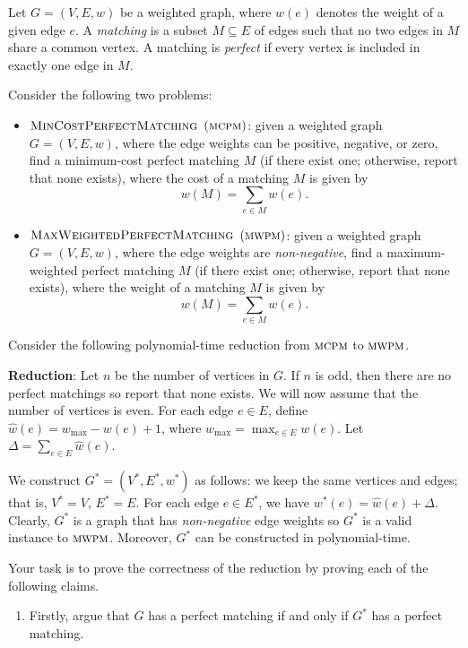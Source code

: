 \documentclass{article}
\begin{document}
\begin{question}
Let $G = (V, E, w)$ be a weighted graph, where $w(e)$ denotes the weight of a given edge $e$. A {\em matching} is a subset $M \subseteq E$ of edges such that no two edges in $M$ share a common vertex. A matching is {\em perfect} if every vertex is included in exactly one edge in $M$.

Consider the following two problems:

\begin{itemize}
    \item $\mathsf{\textsc{MinCostPerfectMatching}}$ $(\mathsf{\textsc{mcpm}})$: given a weighted graph $G = (V, E, w)$, where the edge weights can be positive, negative, or zero, find a minimum-cost perfect matching $M$ (if there exist one; otherwise, report that none exists), where the cost of a matching $M$ is given by \[w(M) = \sum_{e \in M} w(e).\]

    \item $\mathsf{\textsc{MaxWeightedPerfectMatching}}$ $(\mathsf{\textsc{mwpm}})$: given a weighted graph $G = (V, E, w)$, where the edge weights are {\em non-negative}, find a maximum-weighted perfect matching $M$ (if there exist one; otherwise, report that none exists), where the weight of a matching $M$ is given by \[w(M) = \sum_{e \in M} w(e).\]
\end{itemize}

Consider the following polynomial-time reduction from $\mathsf{\textsc{mcpm}}$ to $\mathsf{\textsc{mwpm}}$.

{\bfseries Reduction}: Let $n$ be the number of vertices in $G$. If $n$ is odd, then there are no perfect matchings so report that none exists. We will now assume that the number of vertices is even. For each edge $e \in E$, define $\hat w(e) = w_{\max} - w(e) + 1$, where $w_{\max} = \max_{e \in E} w(e)$. Let $\displaystyle\Delta = \sum_{e \in E} \hat w(e)$.

We construct $G^* = (V^*, E^*, w^*)$ as follows: we keep the same vertices and edges; that is, $V^* = V$, $E^* = E$. For each edge $e \in E^*$, we have $w^*(e) = \hat w(e) + \Delta$. Clearly, $G^*$ is a graph that has {\em non-negative} edge weights so $G^*$ is a valid instance to $\mathsf{\textsc{mwpm}}$. Moreover, $G^*$ can be constructed in polynomial-time.

Your task is to prove the correctness of the reduction by proving each of the following claims.

\begin{enumerate}[label = (\alph*)]
    \item Firstly, argue that $G$ has a perfect matching if and only if $G^*$ has a perfect matching.


\end{enumerate}
\end{question}
\end{document}
